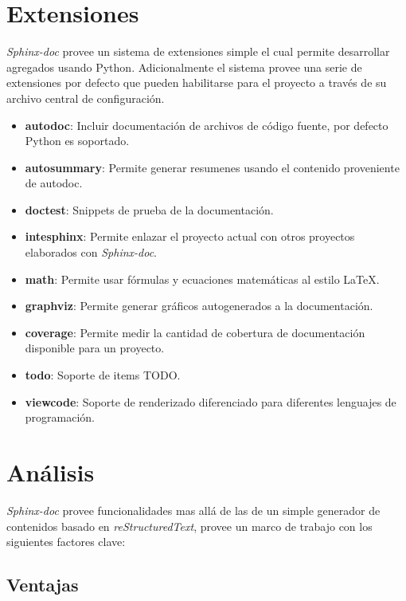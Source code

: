 \documentclass{sig-alternate}
\begin{document}
\section{Extensiones}

	\emph{Sphinx-doc} provee un sistema de extensiones simple el cual permite
	desarrollar agregados usando Python. Adicionalmente el sistema
	provee una serie de extensiones por defecto que pueden habilitarse
	para el proyecto a trav\'es de su archivo central de configuraci\'on.
	
	\begin{itemize}
		\item \textbf{autodoc}: Incluir documentaci\'on de archivos de 
		  c\'odigo fuente, por defecto Python es soportado.
		\item \textbf{autosummary}: Permite generar resumenes usando el contenido
		  proveniente de autodoc.
		\item \textbf{doctest}: Snippets de prueba de la documentaci\'on.
		\item \textbf{intesphinx}: Permite enlazar el proyecto actual con otros 
		  proyectos elaborados con \emph{Sphinx-doc}.
		\item \textbf{math}: Permite usar f\'ormulas y ecuaciones matem\'aticas 
		  al estilo LaTeX.
		\item \textbf{graphviz}: Permite generar gr\'aficos autogenerados 
		  a la documentaci\'on.
		\item \textbf{coverage}: Permite medir la cantidad de cobertura de documentaci\'on
		  disponible para un proyecto.
		\item \textbf{todo}: Soporte de items TODO.
		\item \textbf{viewcode}: Soporte de renderizado diferenciado para diferentes
		  lenguajes de programaci\'on.
	\end{itemize}
		
	
\section{An\'alisis}

	\emph{Sphinx-doc} provee funcionalidades mas all\'a de las de un simple generador de
	contenidos basado en \emph{reStructuredText}, provee un marco de trabajo con
	los siguientes factores clave:
	
	\subsection{Ventajas}
	
\end{document}
